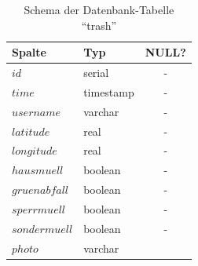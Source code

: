 \documentclass[a4paper, 11pt, DIV=11, listof=numbered, numbers=noenddot]{scrartcl}
\begin{document}
	\begin{table}[h]
		\begin{center}
	
		\begin{tabular}{|l|l|c|}
			\hline
			\textbf{Spalte} & \textbf{Typ} & \textbf{NULL?} \\ \hline
			$id$              & serial        & -                 					\\ \hline
			$time$            & timestamp     & -                 					\\ \hline
			$username$        & varchar       & -                 					\\ \hline
			$latitude$        & real          & -                 					\\ \hline
			$longitude$       & real          & -                 					\\ \hline
			$hausmuell$       & boolean       & -                 					\\ \hline
			$gruenabfall$     & boolean       & -                 					\\ \hline
			$sperrmuell$      & boolean       & -                 					\\ \hline
			$sondermuell$     & boolean       & -                 					\\ \hline
			$photo$           & varchar       & \checkmark                 	\\ \hline
		\end{tabular}
	\caption{Schema der Datenbank-Tabelle \enquote{trash}}
	\label{table:db} 
		\end{center}
	\end{table}
	
\end{document}

